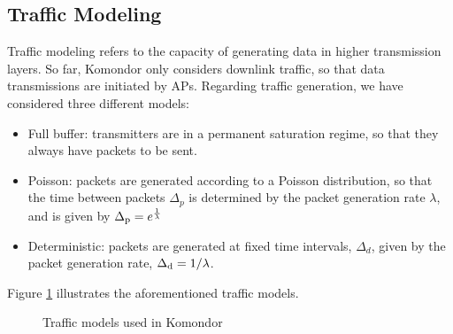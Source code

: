 \documentclass[a4paper]{article}
\begin{document}
	\subsection{Traffic Modeling}
	\label{section:traffic_modelling}
	Traffic modeling refers to the capacity of generating data in higher transmission layers. So far, Komondor only considers downlink traffic, so that data transmissions are initiated by APs. Regarding traffic generation, we have considered three different models:
	\begin{itemize}
		\item Full buffer: transmitters are in a permanent saturation regime, so that they always have packets to be sent.
		\item Poisson: packets are generated according to a Poisson distribution, so that the time between packets $\Delta_p$ is determined by the packet generation rate $\lambda$, and is given by $\Delta_{\rm p} = e^{\frac{1}{\lambda}}$
		\item Deterministic: packets are generated at fixed time intervals, $\Delta_d$, given by the packet generation rate, $\Delta_{\rm d} = 1/\lambda$.
	\end{itemize}

	Figure \ref{fig:traffic_models} illustrates the aforementioned traffic models. 
	\begin{figure}[h!]
		\centering
		\caption{Traffic models used in Komondor}
		\label{fig:traffic_models}
	\end{figure}	
	
\end{document}
